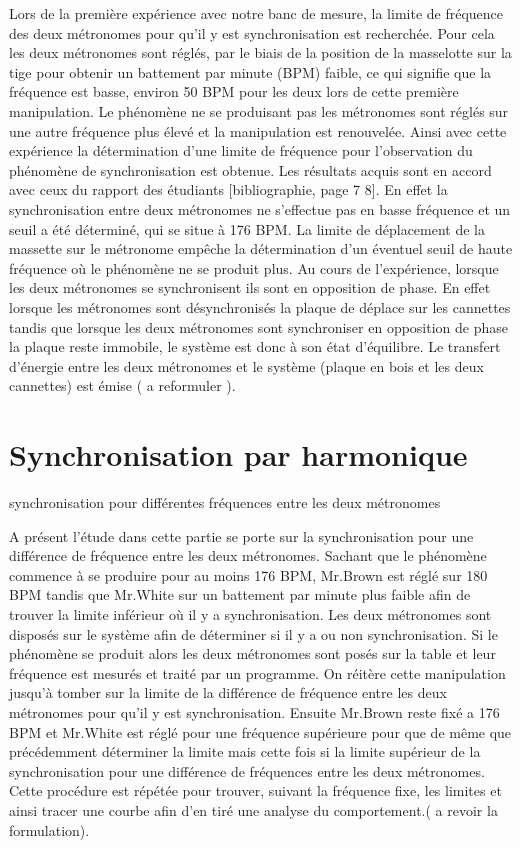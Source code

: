 \documentclass[a4paper,11pt]{report}
\begin{document}
	Lors de la première expérience avec notre banc de mesure, la limite de fréquence des deux métronomes pour qu'il y est synchronisation est recherchée. Pour cela les deux métronomes sont réglés, par le biais de la position de la masselotte sur la tige pour obtenir un battement par minute (BPM) faible, ce qui signifie que la fréquence est basse, environ 50 BPM pour les deux lors de cette première manipulation. Le phénomène ne se produisant pas les métronomes sont réglés sur une autre fréquence plus élevé et la manipulation est renouvelée. Ainsi avec cette expérience la détermination d'une limite de fréquence pour l'observation du phénomène de synchronisation est obtenue. Les résultats acquis sont en accord avec ceux du rapport des étudiants [bibliographie, page 7 8]. En effet la synchronisation entre deux métronomes ne s'effectue pas en basse fréquence et un seuil a été déterminé, qui se situe à 176 BPM. La limite de déplacement de la massette sur le métronome empêche la détermination d'un éventuel seuil de haute fréquence où le phénomène ne se produit plus. Au cours de l'expérience, lorsque les deux métronomes se synchronisent ils sont en opposition de phase. En effet lorsque les métronomes sont désynchronisés la plaque  de déplace sur les cannettes tandis que lorsque les deux métronomes sont synchroniser en opposition de phase la plaque reste immobile, le système est donc à son état d'équilibre. Le transfert d'énergie entre les deux métronomes et le système (plaque en bois et les deux cannettes) est émise ( a reformuler ).


\section{Synchronisation par harmonique}

synchronisation pour différentes fréquences entre les deux métronomes

	A présent l'étude dans cette partie se porte sur la synchronisation pour une différence de fréquence entre les deux métronomes. Sachant que le phénomène commence à se produire pour au moins 176 BPM, Mr.Brown est réglé sur 180 BPM tandis que Mr.White sur un battement par minute plus faible afin de trouver la limite inférieur où il y a synchronisation. Les deux métronomes sont disposés sur le système afin de déterminer si il y a ou non synchronisation. Si le phénomène se produit alors les deux métronomes sont posés sur la table et leur fréquence est mesurés et traité par un programme. On réitère cette manipulation jusqu'à tomber sur la limite de la différence de fréquence entre les deux métronomes pour qu'il y est synchronisation.   Ensuite Mr.Brown reste fixé a 176 BPM et Mr.White est réglé pour une fréquence supérieure pour que de même que précédemment déterminer la limite mais cette fois si la limite supérieur de la synchronisation pour une différence de fréquences entre les deux métronomes. Cette procédure est répétée pour trouver, suivant la fréquence fixe, les limites et ainsi tracer une courbe afin d'en tiré une analyse du comportement.( a revoir la formulation). 
	
\end{document}
